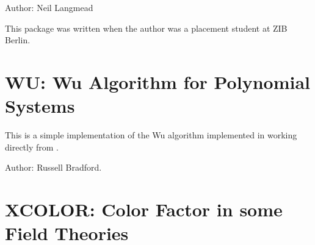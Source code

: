 Author: Neil Langmead

This package was written when the author was a placement student at ZIB Berlin.



\iffalse
\newpage

\section{TRIGSIMP: Simplification and Factorization of Trigonometric
and Hyperbolic Functions}
\indexpackage{TRIGSIMP}

\label{TRIGSIMP}

\iffalse
TRIGSIMP is a useful tool for all kinds of trigonometric and hyperbolic
simplification and factorization.  There are three procedures included in
TRIGSIMP: trigsimp, trigfactorize and triggcd.  The first is for finding
simplifications of trigonometric or hyperbolic expressions with many
options, the second for factorizing them and the third for finding the
greatest common divisor of two trigonometric or hyperbolic polynomials.
\fi
Author: Wolfram Koepf.



\fi
\iffalse
\newpage

\section{TURTLE: Turtle Graphics Interface for \REDUCE}

\indexpackage{TURTLE}
Author: Caroline Cotter


\fi

\newpage

\section{WU: Wu Algorithm for Polynomial Systems}

This is a simple implementation of the Wu algorithm implemented in \REDUCE
working directly from \cite{Wu:1987a}.

Author: Russell Bradford.



\newpage

\section{XCOLOR: Color Factor in some Field Theories}

